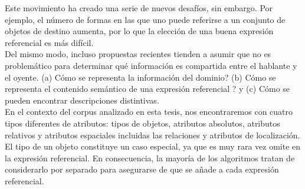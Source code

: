 Este movimiento ha creado una serie de nuevos desaf\'ios, sin embargo. Por ejemplo, el
n\'umero de formas en las que uno puede referirse a un conjunto de objetos de destino aumenta, por lo que la elecci\'on de una
buena expresi\'on referencial es m\'as dif\'icil.\\

Del mismo modo, incluso propuestas recientes tienden a asumir que no es problem\'atico para determinar qu\'e informaci\'on
es compartida entre el hablante y el oyente.
 (a) C\'omo se representa la informaci\'on del dominio?
(b) C\'omo se representa el contenido sem\'antico de una expresi\'on referencial ? y (c) C\'omo se pueden encontrar descripciones distintivas.\\

 En el contexto del corpus analizado en esta tesis, nos encontraremos con cuatro tipos diferentes de atributos:
tipos de objetos, atributos absolutos, atributos relativos y atributos espaciales incluidas las relaciones y atributos de localizaci\'on.\\

El tipo de un objeto constituye un caso especial, ya que es muy rara vez omite
en la expresi\'on referencial. En consecuencia, la mayor\'ia de los algoritmos tratan de
considerarlo por separado para asegurarse de que se a\~nade a cada expresi\'on referencial. \\

